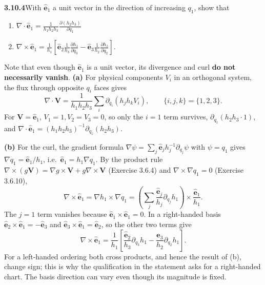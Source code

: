 \par\bigskip
\noindent\textbf{3.10.4}\quad With $\hat{\mathbf{e}}_{1}$ a unit vector in the
direction of increasing $q_{1}$, show that
\begin{enumerate}
\item[(a)] $\displaystyle\nabla\cdot\hat{\mathbf{e}}_{1}
  =\frac{1}{h_{1}h_{2}h_{3}}\frac{\partial(h_{2}h_{3})}{\partial q_{1}}$
\item[(b)] $\displaystyle\nabla\times\hat{\mathbf{e}}_{1}
  =\frac{1}{h_{1}}\left[\hat{\mathbf{e}}_{2}\frac{1}{h_{3}}
  \frac{\partial h_{1}}{\partial q_{3}}
  -\hat{\mathbf{e}}_{3}\frac{1}{h_{2}}\frac{\partial h_{1}}{\partial q_{2}}
  \right]$.
\end{enumerate}
Note that even though $\hat{\mathbf{e}}_{1}$ is a unit vector, its divergence
and curl \textbf{do not necessarily vanish}.
\solution
\textbf{(a)} For physical components $V_i$ in an orthogonal system, the
flux through opposite $q_i$ faces gives
\[
\nabla\cdot\mathbf V=\frac1{h_1h_2h_3}
\sum_i\partial_{q_i}(h_jh_kV_i),\qquad\{i,j,k\}=\{1,2,3\}.
\]
For $\mathbf V=\hat{\mathbf e}_1$, $V_1=1,V_2=V_3=0$, so only the
$i=1$ term survives, $\partial_{q_1}(h_2h_3\cdot1)$, and
$\boxed{\nabla\cdot\hat{\mathbf e}_1=
(h_1h_2h_3)^{-1}\partial_{q_1}(h_2h_3)}$.

\textbf{(b)} For the curl, the gradient formula
$\nabla\psi=\sum_j\hat{\mathbf e}_jh_j^{-1}\partial_{q_j}\psi$ with
$\psi=q_1$ gives $\nabla q_1=\hat{\mathbf e}_1/h_1$, i.e.\
$\hat{\mathbf e}_1=h_1\nabla q_1$. By the product rule
$\nabla\times(g\mathbf V)=\nabla g\times\mathbf V+g\nabla\times\mathbf V$
(Exercise 3.6.4) and $\nabla\times\nabla q_1=0$ (Exercise 3.6.10),
\[
\nabla\times\hat{\mathbf e}_1=\nabla h_1\times\nabla q_1
=\left(\sum_j\frac{\hat{\mathbf e}_j}{h_j}\partial_{q_j}h_1\right)
\times\frac{\hat{\mathbf e}_1}{h_1}.
\]
The $j=1$ term vanishes because $\hat{\mathbf e}_1\times\hat{\mathbf e}_1=0$.
In a right-handed basis
$\hat{\mathbf e}_2\times\hat{\mathbf e}_1=-\hat{\mathbf e}_3$ and
$\hat{\mathbf e}_3\times\hat{\mathbf e}_1=\hat{\mathbf e}_2$, so the
other two terms give
\[
\boxed{\nabla\times\hat{\mathbf e}_1=
\frac1{h_1}\left[
\frac{\hat{\mathbf e}_2}{h_3}\partial_{q_3}h_1
-\frac{\hat{\mathbf e}_3}{h_2}\partial_{q_2}h_1\right]}.
\]
For a left-handed ordering both cross products, and hence the result
of (b), change sign; this is why the qualification in the statement asks
for a right-handed chart.
The basis direction can vary even though its magnitude is fixed.

